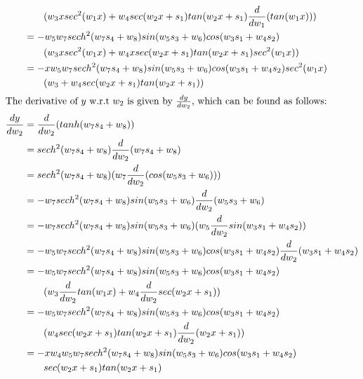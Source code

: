 \documentclass[solution,addpoints,12pt]{exam}
\begin{document}
\begin{questions}
\begin{solution}
\begin{align*}
            & \qquad(w_3 x sec^2(w_1 x) + w_4 sec(w_2 x + s_1)tan(w_2 x + s_1)\frac{d}{dw_1}(tan(w_1 x)))\\
            &= -w_5 w_7 sech^2(w_7 s_4 + w_8)sin(w_5 s_3 + w_6) cos(w_3 s_1 + w_4 s_2)\\
            & \qquad(w_3 x sec^2(w_1 x) + w_4 x sec(w_2 x + s_1)tan(w_2 x + s_1)sec^2(w_1 x))\\
            &= -x w_5 w_7 sech^2(w_7 s_4 + w_8)sin(w_5 s_3 + w_6) cos(w_3 s_1 + w_4 s_2) sec^2(w_1 x)\\
            & \qquad(w_3 + w_4 sec(w_2 x + s_1)tan(w_2 x + s_1))\\
            \intertext{The derivative of $y$ w.r.t $w_2$ is given by $\frac{dy}{dw_2}$,  which can be found as follows:}
            \frac{dy}{dw_2} &= \frac{d}{dw_2}(tanh(w_7 s_4 + w_8))\\
            &= sech^2(w_7 s_4 + w_8)\frac{d}{dw_2}(w_7 s_4 + w_8)\\
            &= sech^2(w_7 s_4 + w_8)(w_7\frac{d}{dw_2}(cos(w_5 s_3 + w_6)))\\
            &= -w_7 sech^2(w_7 s_4 + w_8)sin(w_5 s_3 + w_6) \frac{d}{dw_2}(w_5 s_3 + w_6)\\
            &= -w_7 sech^2(w_7 s_4 + w_8)sin(w_5 s_3 + w_6) (w_5 \frac{d}{dw_2}sin(w_3 s_1 + w_4 s_2))\\
            &= -w_5 w_7 sech^2(w_7 s_4 + w_8)sin(w_5 s_3 + w_6) cos(w_3 s_1 + w_4 s_2)\frac{d}{dw_2}(w_3 s_1 + w_4 s_2)\\
            &= -w_5 w_7 sech^2(w_7 s_4 + w_8)sin(w_5 s_3 + w_6) cos(w_3 s_1 + w_4 s_2)\\
            & \qquad(w_3 \frac{d}{dw_2}tan(w_1 x) + w_4 \frac{d}{dw_2}sec(w_2 x + s_1))\\
            &= -w_5 w_7 sech^2(w_7 s_4 + w_8)sin(w_5 s_3 + w_6) cos(w_3 s_1 + w_4 s_2)\\
            & \qquad( w_4 sec(w_2 x + s_1)tan(w_2 x + s_1)\frac{d}{dw_2}(w_2 x + s_1))\\
            &= -x w_4 w_5 w_7 sech^2(w_7 s_4 + w_8)sin(w_5 s_3 + w_6) cos(w_3 s_1 + w_4 s_2)\\
            & \qquad sec(w_2 x + s_1)tan(w_2 x + s_1)
          \end{align*}
          \end{solution}
          

\end{questions}
\end{document}
